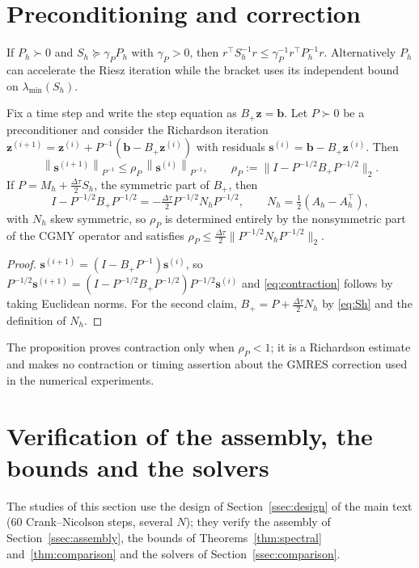 \documentclass[supplement,hidelinks]{siamart251216}
\newcommand{\Mh}{M_h}
\newcommand{\Ah}{A_h}
\newcommand{\Sh}{S_h}
\newcommand{\norm}[1]{\left\lVert #1\right\rVert}
\newcommand{\dt}{\Delta\tau}
\newcommand{\bb}{\mathbf b}
\newcommand{\zz}{\mathbf z}
\newcommand{\sres}{\mathbf s}
\begin{document}
\section{Preconditioning and correction}
\label{ssec:correction-extension}
If $P_h\succ0$ and $\Sh\succeq\gamma_P P_h$ with $\gamma_P>0$, then
$r^\top\Sh^{-1}r\le\gamma_P^{-1}r^\top P_h^{-1}r$.
Alternatively $P_h$ can accelerate the Riesz iteration while the bracket
uses its independent bound on $\lambda_{\min}(\Sh)$.
\begin{proposition}
\label{prop:correction-contraction}
Fix a time step and write the step equation as $B_+\zz=\bb$.  Let $P\succ0$ be
a preconditioner and consider the Richardson iteration
$\zz^{(i+1)}=\zz^{(i)}+P^{-1}(\bb-B_+\zz^{(i)})$ with residuals
$\sres^{(i)}=\bb-B_+\zz^{(i)}$.  Then
\begin{equation}
  \norm{\sres^{(i+1)}}_{P^{-1}}\le\rho_P\,\norm{\sres^{(i)}}_{P^{-1}},
  \qquad
  \rho_P:=\bigl\lVert I-P^{-1/2}B_+P^{-1/2}\bigr\rVert_2 .
  \label{eq:contraction}
\end{equation}
If $P=\Mh+\tfrac{\dt}{2}\Sh$, the symmetric part of $B_+$, then
\[
I-P^{-1/2}B_+P^{-1/2}=-\tfrac{\dt}{2}P^{-1/2}N_hP^{-1/2},\qquad N_h=\tfrac12(\Ah-\Ah^\top),
\]
with $N_h$ skew symmetric, so $\rho_P$ is determined entirely by the nonsymmetric part of the
CGMY operator and satisfies $\rho_P\le\tfrac{\dt}{2}\lVert P^{-1/2}N_hP^{-1/2}\rVert_2$.
\end{proposition}

\begin{proof}
$\sres^{(i+1)}=(I-B_+P^{-1})\sres^{(i)}$, so
$P^{-1/2}\sres^{(i+1)}=(I-P^{-1/2}B_+P^{-1/2})P^{-1/2}\sres^{(i)}$ and
\eqref{eq:contraction} follows by taking Euclidean norms.  For the second
claim, $B_+=P+\tfrac{\dt}{2}N_h$ by \eqref{eq:Sh} and the definition of $N_h$.
\end{proof}
The proposition proves contraction only when $\rho_P<1$; it is a
Richardson estimate and makes no contraction or timing assertion about the
GMRES correction used in the numerical experiments.
\FloatBarrier
\section{Verification of the assembly, the bounds and the solvers}
\label{sm:verification}
The studies of this section use the design of Section~\ref{ssec:design} of the main text (60 Crank--Nicolson
steps, several $N$); they verify the assembly of Section~\ref{ssec:assembly}, the bounds of
Theorems~\ref{thm:spectral} and~\ref{thm:comparison} and the solvers of Section~\ref{ssec:comparison}.
\end{document}
